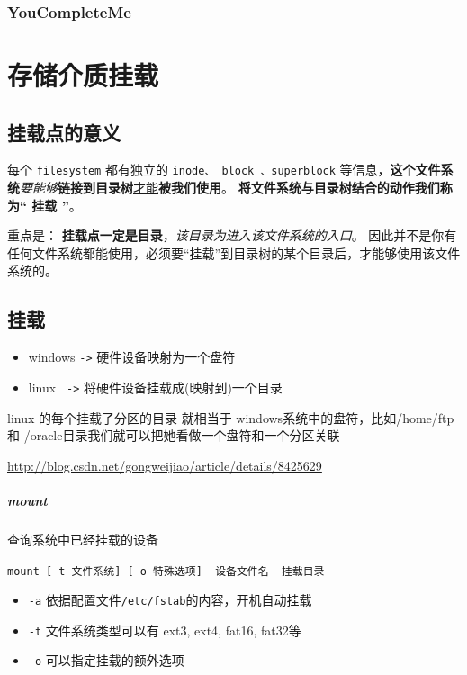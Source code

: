 \documentclass[UTF8,a4paper,12pt]{ctexbook}
\begin{document}
			\subsubsection{YouCompleteMe}
				
	\section{存储介质挂载}
		\subsection{挂载点的意义}
			每个 \verb|filesystem| 都有独立的 \verb|inode、 block 、superblock| 等信息，\textbf{这个文件系统}\textit{要能够}\textbf{链接到目录树}\underline{才能}\textbf{被我们使用}。 \textbf{将文件系统与目录树结合的动作我们称为“ 挂载 ”}。 
			
			重点是： \textbf{挂载点一定是目录}，\textit{该目录为进入该文件系统的入口}。 因此并不是你有任何文件系统都能使用，必须要“挂载”到目录树的某个目录后，才能够使用该文件系统的。
			
		\subsection{挂载}
			\begin{itemize}
				\item windows \verb|->| 硬件设备映射为一个盘符
				\item linux \verb| ->| 将硬件设备挂载成(映射到)一个目录
			\end{itemize}

			linux 的每个挂载了分区的目录 就相当于 windows系统中的盘符，比如/home/ftp 和 /oracle目录我们就可以把她看做一个盘符和一个分区关联
			
			\url{http://blog.csdn.net/gongweijiao/article/details/8425629}
		\subparagraph{mount}查询系统中已经挂载的设备
		
			\verb|mount [-t 文件系统] [-o 特殊选项]  设备文件名  挂载目录|
			
			\begin{itemize}
				\item \verb|-a| 依据配置文件\verb|/etc/fstab|的内容，开机自动挂载
				\item \verb|-t| 文件系统类型可以有 ext3, ext4, fat16, fat32等
				\item \verb|-o| 可以指定挂载的额外选项
			\end{itemize}
		
\end{document}

